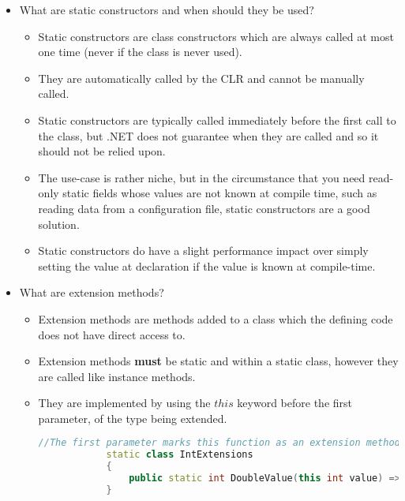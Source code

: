\documentclass{article}
\begin{document}
\begin{itemize}
\begin{itemize}
\begin{lstlisting}[language=C++]
                //Now the base class can still be instantiated, the derived class constructors               second argument effectively has a different "default" value than the base class,             and the functionality of the constructor does not need to be duplicated between              the base and derived class (as would be necessary for function overriding)
                \end{lstlisting}
    \end{itemize}
    \item What are static constructors and when should they be used?
    \begin{itemize}
        \item Static constructors are class constructors which are always called at most one time (never if the class is never used).
        \item They are automatically called by the CLR and cannot be manually called.
        \item Static constructors are typically called immediately before the first call to the class, but .NET does not guarantee when they are called and so it should not be relied upon.
        \item The use-case is rather niche, but in the circumstance that you need read-only static fields whose values are not known at compile time, such as reading data from a configuration file, static constructors are a good solution.
        \item Static constructors do have a slight performance impact over simply setting the value at declaration if the value is known at compile-time.
    \end{itemize}
   
    \item What are extension methods?
    \begin{itemize}
        \item Extension methods are methods added to a class which the defining code does not have direct access to.
        \item Extension methods \textbf{must} be static and within a static class, however they are called like instance methods.
        \item They are implemented by using the $this$ keyword before the first parameter, of the type being extended.
        \begin{lstlisting}[language=C++]
            //The first parameter marks this function as an extension method, and does NOT               require an argument to be used in the method call
            static class IntExtensions
            {
                public static int DoubleValue(this int value) => return value*2;
            }
            

\end{lstlisting}
\end{itemize}
\end{itemize}
\end{document}
